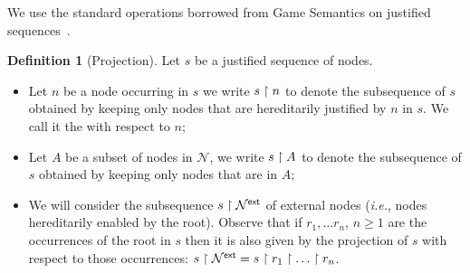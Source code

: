 \documentclass{article}
\makeatletter
\theoremstyle{plain}
\theoremstyle{definition}
\newtheorem{definition}{Definition}[section]
\theoremstyle{remark}
\newcommand\Nodes{\mathcal{N}}%
\newcommand{\ExtNodes}{\Nodes^{\sf ext}}
\renewcommand\ie{{\it i.e.\@\xspace}}
\makeatother
\begin{document}
We use the standard operations borrowed from Game Semantics on justified sequences~\cite{Abr02}.

\begin{definition}[Projection]
Let $s$ be a justified sequence of nodes.

\begin{itemize}
\item Let $n$ be a node occurring in $s$ we write $s\upharpoonright n$ to denote the subsequence of $s$ obtained by keeping only nodes that are hereditarily justified by $n$ in $s$. We call it the  with respect to $n$;

 \item Let $A$ be a subset of nodes in $\Nodes$, we write $s \upharpoonright A$ to denote the subsequence of $s$ obtained by keeping only nodes that are in $A$;

 \item We will consider the subsequence $s\filter\ExtNodes$ of external nodes (\ie, nodes hereditarily enabled by the root). Observe that if $r_1, \ldots r_n$, $n\geq 1$ are the occurrences of the root in $s$ then it is also given by the projection of $s$ with respect to those occurrences: $s\filter\ExtNodes = s\filter r_1 \filter \ldots \filter r_n$.
\end{itemize}
\end{definition}
\end{document}

